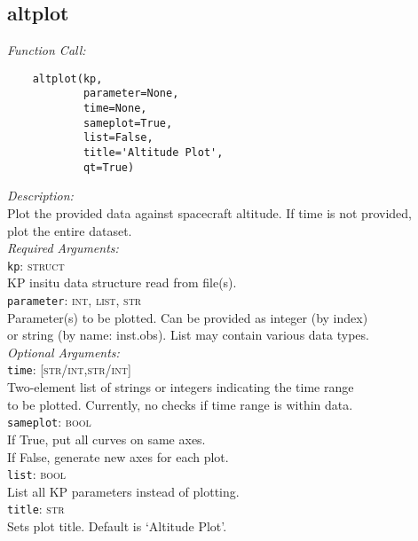 \documentclass{article}
\begin{document}
\subsection{altplot}
\label{subsec:altplot}
\vspace{-5mm}
\textit{Function Call:}\\
\vspace{-10mm}
\begin{verbatim}
    altplot(kp,
            parameter=None,
            time=None,
            sameplot=True,
            list=False,
            title='Altitude Plot',
            qt=True)
\end{verbatim}
\vspace{-5mm}
\noindent
\textit{Description:}\\
\indent Plot the provided data against spacecraft altitude. If time is not provided,\\
\indent plot the entire dataset.\\
\textit{Required Arguments:}\\
\indent \texttt{kp}: \textsc{struct}\\
\indent \indent KP insitu data structure read from file(s).\\ 
\indent \texttt{parameter}: \textsc{int, list, str}\\
\indent \indent Parameter(s) to be plotted. Can be provided as integer (by index)\\
\indent \indent or string (by name: inst.obs). List may contain various data types.\\
\noindent \textit{Optional Arguments:}\\
\indent \texttt{time}: \textsc{[str/int,str/int]}\\
\indent \indent Two-element list of strings or integers indicating the time range\\
\indent \indent to be plotted. Currently, no checks if time range is within data.\\
\indent \texttt{sameplot}: \textsc{bool}\\
\indent \indent If True, put all curves on same axes.\\
\indent \indent If False, generate new axes for each plot.\\
\indent \texttt{list}: \textsc{bool}\\
\indent \indent List all KP parameters instead of plotting.\\
\indent \texttt{title}: \textsc{str}\\
\indent \indent Sets plot title. Default is `Altitude Plot'.\\
\end{document}
